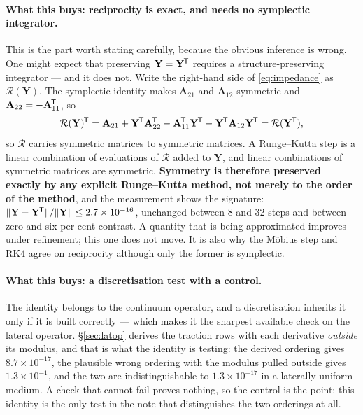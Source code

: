 \documentclass[11pt,a4paper]{article}
\newcommand{\bA}{\mathbf{A}}
\newcommand{\tp}{^{\mkern-1.5mu\mathsf{T}}}
\newcommand{\bY}{\mathbf{Y}}
\begin{document}
\paragraph{What this buys: reciprocity is exact, and needs no symplectic
integrator.}  This is the part worth stating carefully, because the obvious
inference is wrong.  One might expect that preserving $\bY=\bY\tp$ requires a
structure-preserving integrator --- and it does not.  Write the right-hand side
of \eqref{eq:impedance} as $\mathcal{R}(\bY)$.  The symplectic identity makes
$\bA_{21}$ and $\bA_{12}$ symmetric and $\bA_{22}=-\bA_{11}\tp$, so
\begin{equation}\label{eq:rhssym}
  \mathcal{R}(\bY)\tp
  = \bA_{21} + \bY\tp\bA_{22}\tp - \bA_{11}\tp\bY\tp - \bY\tp\bA_{12}\bY\tp
  = \mathcal{R}(\bY\tp),
\end{equation}
so $\mathcal{R}$ carries symmetric matrices to symmetric matrices.  A
Runge--Kutta step is a linear combination of evaluations of $\mathcal{R}$ added
to $\bY$, and linear combinations of symmetric matrices are symmetric.
\textbf{Symmetry is therefore preserved exactly by any explicit Runge--Kutta
method, not merely to the order of the method}, and the measurement shows the
signature: $\|\bY-\bY\tp\|/\|\bY\| \le 2.7\times10^{-16}$, unchanged between $8$
and $32$ steps and between zero and six per cent contrast.  A quantity that is
being approximated improves under refinement; this one does not move.  It is
also why the M\"obius step and RK4 agree on reciprocity although only the former
is symplectic.

\paragraph{What this buys: a discretisation test with a control.}  The identity
belongs to the continuum operator, and a discretisation inherits it only if it
is built correctly --- which makes it the sharpest available check on the
lateral operator.  \S\ref{sec:latop} derives the traction rows with each
derivative \emph{outside} its modulus, and that is what the identity is
testing: the derived ordering gives $8.7\times10^{-17}$, the plausible wrong
ordering with the modulus pulled outside gives $1.3\times10^{-1}$, and the two
are indistinguishable to $1.3\times10^{-17}$ in a laterally uniform medium.  A
check that cannot fail proves nothing, so the control is the point: this
identity is the only test in the note that distinguishes the two orderings at
all.
\end{document}
